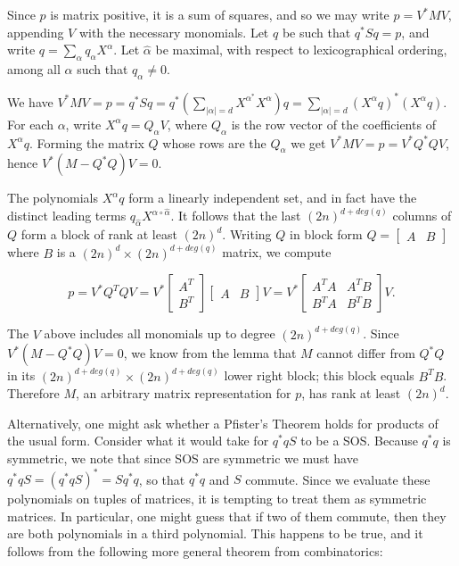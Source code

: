 \documentclass[11pt]{amsart}
\begin{document}
\proof Since $p$ is matrix positive, it is a sum of squares, and so we may write $p = V^*MV$, appending $V$ with the necessary monomials.  Let $q$ be such that $q^*Sq=p$, and write $q= \sum_\alpha q_\alpha X^\alpha$.  Let $\hat \alpha$ be maximal, with respect to lexicographical ordering, among all $\alpha$ such that $q_\alpha \neq 0$.

We have $V^*MV=p=q^*Sq=q^*( \sum_{|\alpha|=d} X^{\alpha^*}X^\alpha)q=\sum_{|\alpha|=d} (X^{\alpha}q)^*(X^\alpha q)$. For each $\alpha$, write $X^\alpha q= Q_\alpha V$, where $Q_\alpha$ is the row vector of the coefficients of $X^\alpha q$.  Forming the matrix $Q$ whose rows are the $Q_\alpha$ we get $V^*MV=p=V^*Q^*QV$, hence $V^*(M-Q^*Q)V=0$.  

The polynomials $X^\alpha q$ form a linearly independent set, and in fact have the distinct leading terms $q_{\hat \alpha}X^{\alpha \circ \hat \alpha}$.  It follows that the last $(2n)^{d+deg(q)}$ columns of $Q$ form a block of rank at least $(2n)^d$.  Writing $Q$ in block form $Q=\begin{bmatrix}A&B\end{bmatrix}$ where $B$ is a $(2n)^d\times (2n)^{d+deg(q)}$ matrix, we compute

\[p=V^*Q^TQV=V^*\begin{bmatrix} A^T \\ B^T \end{bmatrix} \begin{bmatrix}A&B\end{bmatrix}V=V^*\begin{bmatrix}A^TA & A^TB\\ B^TA & B^TB\end{bmatrix}V.\]


The $V$ above includes all monomials up to degree $(2n)^{d+deg(q)}$.  Since $V^*(M-Q^*Q)V=0$, we know from the lemma that $M$ cannot differ from $Q^*Q$ in its $(2n)^{d+deg(q)}\times (2n)^{d+deg(q)}$ lower right block; this block equals $B^TB$.  Therefore $M$, an arbitrary matrix representation for $p$, has rank at least $(2n)^d$.\endproof

Alternatively, one might ask whether a Pfister's Theorem holds for products of the usual form. Consider what it would take for $q^*qS$ to be a SOS.  Because $q^*q$ is symmetric, we note that since SOS are symmetric we must have $q^*qS=(q^*qS)^*=Sq^*q$, so that $q^*q$ and $S$ commute.  Since we evaluate these polynomials on tuples of matrices, it is tempting to treat them as symmetric matrices.  In particular, one might guess that if two of them commute, then they are both polynomials in a third polynomial. This happens to be true, and it follows from the following more general theorem from combinatorics:
\end{document}
